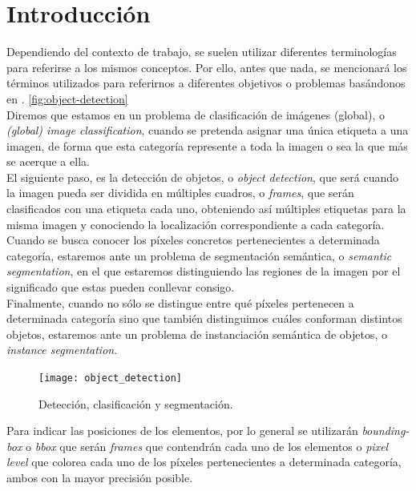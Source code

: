 \chapter{Introducción}
Dependiendo del contexto de trabajo, se suelen utilizar diferentes terminologías para referirse a los mismos conceptos. Por ello, antes que nada, se mencionará los términos utilizados para referirnos a diferentes objetivos o problemas basándonos en \cite{2019arXiv190803673W}. \autoref{fig:object-detection}\\

Diremos que estamos en un problema de clasificación de imágenes (global), o \emph{(global) image classification}, cuando se pretenda asignar una única etiqueta a una imagen, de forma que esta categoría represente a toda la imagen o sea la que más se acerque a ella.\\

El siguiente paso, es la detección de objetos, o \emph{object detection}, que será cuando la imagen pueda ser dividida en múltiples cuadros, o \emph{frames}, que serán clasificados con una etiqueta cada uno, obteniendo así múltiples etiquetas para la misma imagen y conociendo la localización correspondiente a cada categoría.\\

Cuando se busca conocer los píxeles concretos pertenecientes a determinada categoría, estaremos ante un problema de segmentación semántica, o \emph{semantic segmentation}, en el que estaremos distinguiendo las regiones de la imagen por el significado que estas pueden conllevar consigo.\\

Finalmente, cuando no sólo se distingue entre qué píxeles pertenecen a determinada categoría sino que también distinguimos cuáles conforman distintos objetos, estaremos ante un problema de instanciación semántica de objetos, o \emph{instance segmentation}.\\

\begin{figure}[htpb]
  \centering
  \texttt{[image: object\_detection]}
  \caption{Detección, clasificación y segmentación. \cite{2019arXiv190803673W}}
  \label{fig:object-detection}
\end{figure}

Para indicar las posiciones de los elementos, por lo general se utilizarán \emph{bounding-box} o \emph{bbox} que serán \emph{frames} que contendrán cada uno de los elementos o \emph{pixel level} que colorea cada uno de los píxeles pertenecientes a determinada categoría, ambos con la mayor precisión posible.\\

